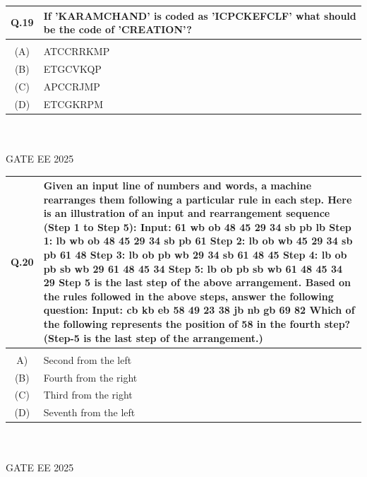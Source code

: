 \documentclass[journal,12pt,onecolumn]{IEEEtran}
\theoremstyle{remark}
\begin{document}
\begin{tabular}{|c|p{16cm}|}\hline
   Q.19 & If 'KARAMCHAND' is coded as 'ICPCKEFCLF' what should be the code of 'CREATION'? \\   \hline
     & \\    \hline
  (A) & ATCCRRKMP \\
\hline
(B) & ETGCVKQP \\
\hline
(C) & APCCRJMP \\
\hline
(D) & ETCGKRPM \\
\hline
\end{tabular} ~\\ \\
GATE EE 2025\\

\begin{tabular}{|c|p{16cm}|}\hline
   Q.20 & { Given an input line of numbers and words, a machine rearranges them following a particular rule in each step. Here is an illustration of an input and rearrangement sequence (Step 1 to Step 5): \newline
Input: 61 wb ob 48 45 29 34 sb pb lb \newline
Step 1: lb wb ob 48 45 29 34 sb pb 61 \newline
Step 2: lb ob wb 45 29 34 sb pb 61 48 \newline
Step 3: lb ob pb wb 29 34 sb 61 48 45 \newline
Step 4: lb ob pb sb wb 29 61 48 45 34 \newline
Step 5: lb ob pb sb wb 61 48 45 34 29 \newline
Step 5 is the last step of the above arrangement. \newline
Based on the rules followed in the above steps, answer the following question: \newline
Input: cb kb eb 58 49 23 38 jb nb gb 69 82 \newline
Which of the following represents the position of 58 in the fourth step? (Step-5 is the last step of the arrangement.) } \\   \hline
     & \\    \hline
  A) & Second from the left \\
\hline
(B) & Fourth from the right \\
\hline
(C) & Third from the right \\
\hline
(D) & Seventh from the left \\
\hline
\end{tabular} ~\\ \\
GATE EE 2025\\
\end{document}
